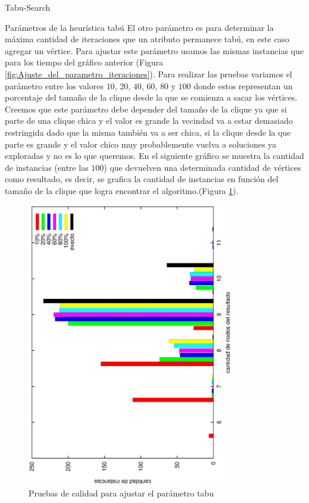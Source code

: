 \begin{section}{Tabu-Search}
\begin{subsection}{Parámetros de la heurística tabú}
		El otro parámetro es para determinar la máxima cantidad de iteraciones que un atributo permanece tabú, en este caso agregar un vértice. Para ajustar este parámetro usamos las mismas instancias que para los tiempo del gráfico anterior (Figura \ref{fig:Ajuste_del_parametro_iteraciones}). Para realizar las pruebas variamos el parámetro entre los valores $10$, $20$, $40$, $60$, $80$ y $100$ donde estos representan un porcentaje del tamaño de la clique desde la que se comienza a sacar los vértices. Creemos que este parámetro debe depender del tamaño de la clique ya que si parte de una clique chica y el valor es grande la vecindad va a estar demasiado restringida dado que la misma también va a ser chica, si la clique desde la que parte es grande y el valor chico muy probablemente vuelva a soluciones ya exploradas y no es lo que queremos. En el siguiente gráfico se muestra la cantidad de instancias (entre las $100$) que devuelven una determinada cantidad de vértices como resultado, es decir, se grafica la cantidad de instancias en función del tamaño de la clique que logra encontrar el algoritmo.(Figura \ref{fig:Ajuste_del_parametro_tabu}).

	\begin{figure}[H]
		\centering
		    	\includegraphics[width=9cm,angle=-90]{tabu_search/max_tabu2.eps}
		\caption{Pruebas de calidad para ajustar el parámetro tabu}
		\label{fig:Ajuste_del_parametro_tabu}
	\end{figure}


\end{subsection}
\end{section}
